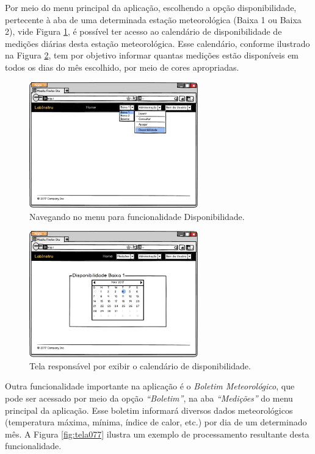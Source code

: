 Por meio do menu principal da aplicação, escolhendo a opção disponibilidade, pertecente à aba de uma determinada estação meteorológica (Baixa 1 ou Baixa 2), vide Figura \ref{fig:tela072}, é possível ter acesso ao calendário de disponibilidade de medições diárias desta estação meteorológica. Esse calendário, conforme ilustrado na Figura \ref{fig:tela073}, tem por objetivo informar quantas medições estão disponíveis em todos os dias do mês escolhido, por meio de cores apropriadas.

\begin{figure}[H]
	\centering
	\includegraphics[width=0.65\textwidth]{./img/telas/tela072.png}
	\caption{Navegando no menu para funcionalidade Disponibilidade.} \label{fig:tela072}
\end{figure}

\begin{figure}[H]
	\centering
	\includegraphics[width=0.65\textwidth]{./img/telas/tela073.png}
	\caption{Tela responsável por exibir o calendário de disponibilidade.} \label{fig:tela073}
\end{figure}

Outra funcionalidade importante na aplicação é o \textit{Boletim Meteorológico}, que pode ser acessado por meio da opção \textit{``Boletim''}, na aba \textit{``Medições''} do menu principal da aplicação. Esse boletim informará diversos dados meteorológicos (temperatura máxima, mínima, índice de calor, etc.) por dia de um determinado mês. A Figura \ref{fig:tela077} ilustra um exemplo de processamento resultante desta funcionalidade.

